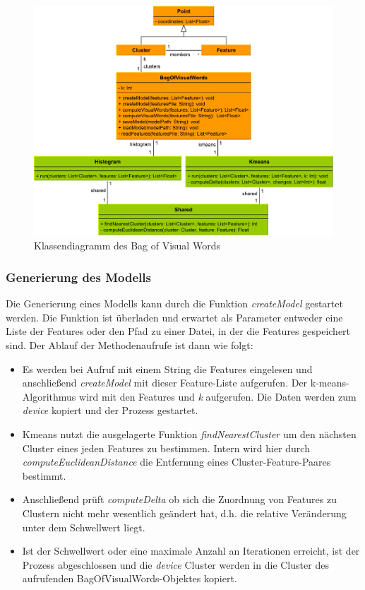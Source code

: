 \begin{figure}
	\centering
	\includegraphics[scale=0.57]{images/bovw_class.pdf}
	\caption{Klassendiagramm des Bag of Visual Words}
	\label{img:bovw_class}
\end{figure}
 
\subsubsection{Generierung des Modells}

Die Generierung eines Modells kann durch die Funktion \textit{createModel} gestartet werden. Die Funktion ist überladen und erwartet als Parameter entweder eine Liste der Features oder den Pfad zu einer Datei, in der die Features gespeichert sind. Der Ablauf der Methodenaufrufe ist dann wie folgt:

\begin{itemize}
	\item Es werden bei Aufruf mit einem String die Features eingelesen und anschließend \textit{createModel} mit dieser Feature-Liste aufgerufen. Der k-means-Algorithmus wird mit den Features und \textit{k} aufgerufen. Die Daten werden zum \textit{device} kopiert und der Prozess gestartet. 
	\item Kmeans nutzt die ausgelagerte Funktion \textit{findNearestCluster} um den nächsten Cluster eines jeden Features zu bestimmen. Intern wird hier durch \textit{computeEuclideanDistance} die Entfernung eines Cluster-Feature-Paares bestimmt.
	\item Anschließend prüft \textit{computeDelta} ob sich die Zuordnung von Features zu Clustern nicht mehr wesentlich geändert hat, d.h. die relative Veränderung unter dem Schwellwert liegt.
	\item Ist der Schwellwert oder eine maximale Anzahl an Iterationen erreicht, ist der Prozess abgeschlossen und die \textit{device} Cluster werden in die Cluster des aufrufenden BagOfVisualWords-Objektes kopiert.
\end{itemize}
 
